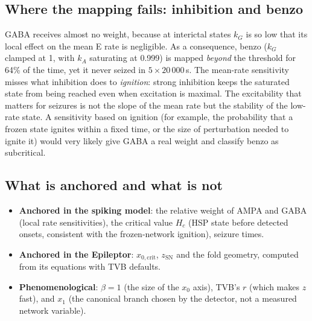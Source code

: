 \documentclass[11pt]{article}
\newcommand{\kA}{k_A}
\newcommand{\kG}{k_G}
\newcommand{\xc}{x_{0,\mathrm{crit}}}
\newcommand{\zsn}{z_{\mathrm{SN}}}
\begin{document}
\subsection{Where the mapping fails: inhibition and benzo}
GABA receives almost no weight, because at interictal states $\kG$ is so low that its local effect on the mean E rate is
negligible. As a consequence, benzo ($\kG$ clamped at 1, with $\kA$ saturating at 0.999) is mapped \emph{beyond} the
threshold for 64\% of the time, yet it never seized in $5\times20\,000$\,s. The mean-rate sensitivity misses what
inhibition does to \emph{ignition}: strong inhibition keeps the saturated state from being reached even when excitation
is maximal. The excitability that matters for seizures is not the slope of the mean rate but the stability of the
low-rate state. A sensitivity based on ignition (for example, the probability that a frozen state ignites within a
fixed time, or the size of perturbation needed to ignite it) would very likely give GABA a real weight and classify benzo
as subcritical.

\subsection{What is anchored and what is not}
\begin{itemize}
\item \textbf{Anchored in the spiking model}: the relative weight of AMPA and GABA (local rate sensitivities), the critical
value $H_c$ (HSP state before detected onsets, consistent with the frozen-network ignition), seizure times.
\item \textbf{Anchored in the Epileptor}: $\xc$, $\zsn$ and the fold geometry, computed from its equations with TVB defaults.
\item \textbf{Phenomenological}: $\beta=1$ (the size of the $x_0$ axis), TVB's $r$ (which makes $z$ fast), and $x_1$ (the
canonical branch chosen by the detector, not a measured network variable).
\end{itemize}

\end{document}
